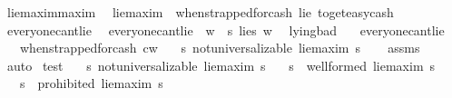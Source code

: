 \begin{isabellebody}
\isamarkupfalse%
\ lie{\isacharunderscore}maxim{\isacharcolon}{\isacharcolon}maxim\ \ \isanewline
{\isachardoublequoteopen}lie{\isacharunderscore}maxim\ {\isasymequiv}\ {\isacharparenleft}when{\isacharunderscore}strapped{\isacharunderscore}for{\isacharunderscore}cash{\isacharcomma}\ lie{\isacharcomma}\ to{\isacharunderscore}get{\isacharunderscore}easy{\isacharunderscore}cash{\isacharparenright}{\isachardoublequoteclose}\isanewline
\isanewline
{}\isamarkupfalse%
\ everyone{\isacharunderscore}can{\isacharprime}t{\isacharunderscore}lie\ \ \isanewline
{\isachardoublequoteopen}everyone{\isacharunderscore}can{\isacharprime}t{\isacharunderscore}lie\ {\isasymequiv}\ {\isasymforall}w{\isachardot}\ {\isasymnot}\ {\isacharparenleft}{\isasymforall}s{\isachardot}\ lie{\isacharparenleft}s{\isacharparenright}\ w{\isacharparenright}\ {\isachardoublequoteclose}\isanewline
\isanewline
{}\isamarkupfalse%
\ lying{\isacharunderscore}bad{\isacharcolon}\isanewline
\ \ \ everyone{\isacharunderscore}can{\isacharprime}t{\isacharunderscore}lie\isanewline
\ \ \ {\isachardoublequoteopen}when{\isacharunderscore}strapped{\isacharunderscore}for{\isacharunderscore}cash\ cw{\isachardoublequoteclose}\isanewline
\ \ \ {\isachardoublequoteopen}{\isasymforall}s{\isachardot}\ not{\isacharunderscore}universalizable\ lie{\isacharunderscore}maxim\ s{\isachardoublequoteclose}\isanewline
%
\isadelimproof
\ \ %
\endisadelimproof
%
\isatagproof
{}\isamarkupfalse%
\ assms{\isacharparenleft}{}{\isacharparenright}\ \isamarkupfalse%
\ auto%
\endisatagproof
{\isafoldproof}%
%
\isadelimproof
\isanewline
%
\endisadelimproof
\isanewline
{}\isamarkupfalse%
\ test{}{\isacharcolon}\isanewline
\ \ \ {\isachardoublequoteopen}{\isasymforall}s{\isachardot}\ not{\isacharunderscore}universalizable\ lie{\isacharunderscore}maxim\ s{\isachardoublequoteclose}\isanewline
\ \ \ {\isachardoublequoteopen}{\isasymforall}s{\isachardot}\ {\isasymTurnstile}\ {\isacharparenleft}well{\isacharunderscore}formed\ lie{\isacharunderscore}maxim\ s{\isacharparenright}{\isachardoublequoteclose}\isanewline
\ \ \ {\isachardoublequoteopen}{\isasymforall}s{\isachardot}\ {\isasymTurnstile}\ {\isacharparenleft}prohibited\ lie{\isacharunderscore}maxim\ s{\isacharparenright}{\isachardoublequoteclose}\isanewline
%
\isadelimproof
\ \ %
\endisadelimproof
%
\isatagproof

\end{isabellebody}
